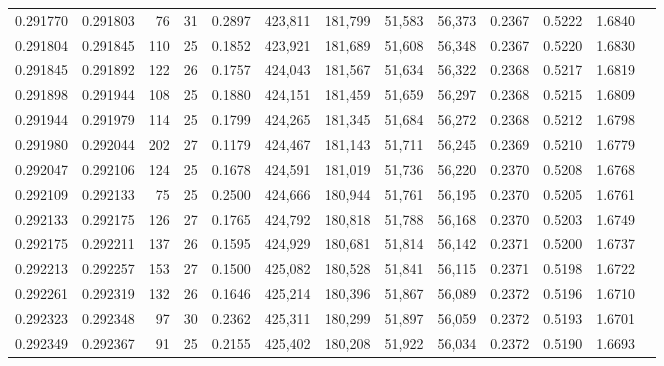 \begin{tabular}{rrrrrrrrrrrrr}
0.291770 & 0.291803 &    76 &  31 &                                     0.2897 & 423,811 & 181,799 &  51,583 &  56,373 & 0.2367 & 0.5222 & 1.6840 \\
0.291804 & 0.291845 &   110 &  25 &                                     0.1852 & 423,921 & 181,689 &  51,608 &  56,348 & 0.2367 & 0.5220 & 1.6830 \\
0.291845 & 0.291892 &   122 &  26 &                                     0.1757 & 424,043 & 181,567 &  51,634 &  56,322 & 0.2368 & 0.5217 & 1.6819 \\
0.291898 & 0.291944 &   108 &  25 &                                     0.1880 & 424,151 & 181,459 &  51,659 &  56,297 & 0.2368 & 0.5215 & 1.6809 \\
0.291944 & 0.291979 &   114 &  25 &                                     0.1799 & 424,265 & 181,345 &  51,684 &  56,272 & 0.2368 & 0.5212 & 1.6798 \\
0.291980 & 0.292044 &   202 &  27 &                                     0.1179 & 424,467 & 181,143 &  51,711 &  56,245 & 0.2369 & 0.5210 & 1.6779 \\
0.292047 & 0.292106 &   124 &  25 &                                     0.1678 & 424,591 & 181,019 &  51,736 &  56,220 & 0.2370 & 0.5208 & 1.6768 \\
0.292109 & 0.292133 &    75 &  25 &                                     0.2500 & 424,666 & 180,944 &  51,761 &  56,195 & 0.2370 & 0.5205 & 1.6761 \\
0.292133 & 0.292175 &   126 &  27 &                                     0.1765 & 424,792 & 180,818 &  51,788 &  56,168 & 0.2370 & 0.5203 & 1.6749 \\
0.292175 & 0.292211 &   137 &  26 &                                     0.1595 & 424,929 & 180,681 &  51,814 &  56,142 & 0.2371 & 0.5200 & 1.6737 \\
0.292213 & 0.292257 &   153 &  27 &                                     0.1500 & 425,082 & 180,528 &  51,841 &  56,115 & 0.2371 & 0.5198 & 1.6722 \\
0.292261 & 0.292319 &   132 &  26 &                                     0.1646 & 425,214 & 180,396 &  51,867 &  56,089 & 0.2372 & 0.5196 & 1.6710 \\
0.292323 & 0.292348 &    97 &  30 &                                     0.2362 & 425,311 & 180,299 &  51,897 &  56,059 & 0.2372 & 0.5193 & 1.6701 \\
0.292349 & 0.292367 &    91 &  25 &                                     0.2155 & 425,402 & 180,208 &  51,922 &  56,034 & 0.2372 & 0.5190 & 1.6693 \\

\end{tabular}
